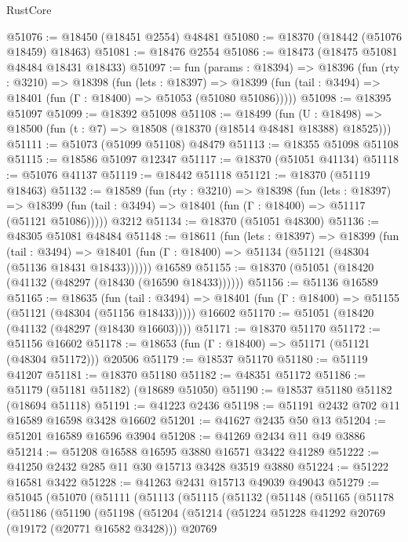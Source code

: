 \begin{lexlean}{RustCore}
\begin{coremodule}
@51076 := @18450 (@18451 @2554) @48481
@51080 := @18370 (@18442 (@51076 @18459) @18463)
@51081 := @18476 @2554
@51086 := @18473 (@18475 @51081 @48484 @18431 @18433)
@51097 := fun (params : @18394) =>
  @18396
    (fun (rty : @3210) =>
    @18398
      (fun (lets : @18397) =>
      @18399 (fun (tail : @3494) => @18401 (fun (Γ : @18400) => @51053 (@51080 @51086)))))
@51098 := @18395 @51097
@51099 := @18392 @51098
@51108 := @18499
    (fun (U : @18498) => @18500 (fun (t : @7) => @18508 (@18370 (@18514 @48481 @18388) @18525)))
@51111 := @51073 (@51099 @51108) @48479
@51113 := @18355 @51098 @51108
@51115 := @18586 @51097 @12347
@51117 := @18370 (@51051 @41134)
@51118 := @51076 @41137
@51119 := @18442 @51118
@51121 := @18370 (@51119 @18463)
@51132 := @18589
    (fun (rty : @3210) =>
    @18398
      (fun (lets : @18397) =>
      @18399 (fun (tail : @3494) => @18401 (fun (Γ : @18400) => @51117 (@51121 @51086)))))
    @3212
@51134 := @18370 (@51051 @48300)
@51136 := @48305 @51081 @48484
@51148 := @18611
    (fun (lets : @18397) =>
    @18399
      (fun (tail : @3494) =>
      @18401 (fun (Γ : @18400) => @51134 (@51121 (@48304 (@51136 @18431 @18433))))))
    @16589
@51155 := @18370 (@51051 (@18420 (@41132 (@48297 (@18430 (@16590 @18433))))))
@51156 := @51136 @16589
@51165 := @18635
    (fun (tail : @3494) => @18401 (fun (Γ : @18400) => @51155 (@51121 (@48304 (@51156 @18433)))))
    @16602
@51170 := @51051 (@18420 (@41132 (@48297 (@18430 @16603))))
@51171 := @18370 @51170
@51172 := @51156 @16602
@51178 := @18653 (fun (Γ : @18400) => @51171 (@51121 (@48304 @51172))) @20506
@51179 := @18537 @51170
@51180 := @51119 @41207
@51181 := @18370 @51180
@51182 := @48351 @51172
@51186 := @51179 (@51181 @51182) (@18689 @51050)
@51190 := @18537 @51180 @51182 (@18694 @51118)
@51191 := @41223 @2436
@51198 := @51191 @2432 @702 @11 @16589 @16598 @3428 @16602
@51201 := @41627 @2435 @50 @13
@51204 := @51201 @16589 @16596 @3904
@51208 := @41269 @2434 @11 @49 @3886
@51214 := @51208 @16588 @16595 @3880 @16571 @3422 @41289
@51222 := @41250 @2432 @285 @11 @30 @15713 @3428 @3519 @3880
@51224 := @51222 @16581 @3422
@51228 := @41263 @2431 @15713 @49039 @49043
@51279 := @51045
    (@51070
      (@51111
        (@51113
          (@51115
            (@51132
              (@51148
                (@51165
                  (@51178
                    (@51186
                      (@51190
                        (@51198
                          (@51204
                            (@51214
                              (@51224 @51228 @41292 @20769 (@19172 (@20771 @16582 @3428)))
                              @20769

\end{coremodule}
\end{lexlean}
